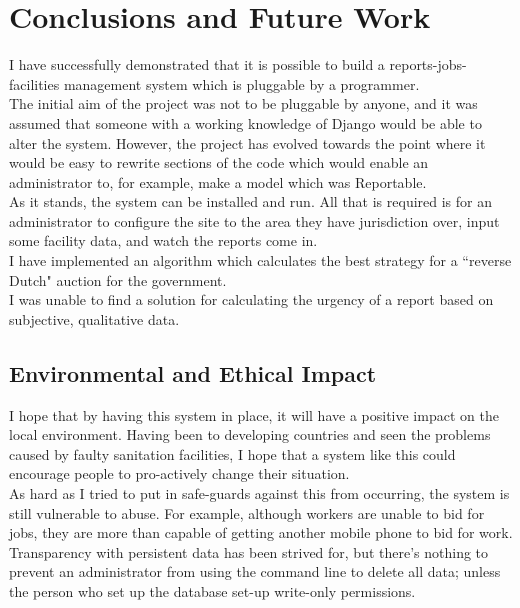 \chapter{Conclusions and Future Work}

I have successfully demonstrated that it is possible to build a reports-jobs-facilities management system which is pluggable by a programmer. \\

The initial aim of the project was not to be pluggable by anyone, and it was assumed that someone with a working knowledge of Django would be able to alter the system. However, the project has evolved towards the point where it would be easy to rewrite sections of the code which would enable an administrator to, for example, make a model which was Reportable. \\

As it stands, the system can be installed and run. All that is required is for an administrator to configure the site to the area they have jurisdiction over, input some facility data, and watch the reports come in. \\

I have implemented an algorithm which calculates the best strategy for a ``reverse Dutch" auction for the government. \\

I was unable to find a solution for calculating the urgency of a report based on subjective, qualitative data.

\section{Environmental and Ethical Impact}
I hope that by having this system in place, it will have a positive impact on the local environment. Having been to developing countries and seen the problems caused by faulty sanitation facilities, I hope that a system like this could encourage people to pro-actively change their situation. \\

As hard as I tried to put in safe-guards against this from occurring, the system is still vulnerable to abuse. For example, although workers are unable to bid for jobs, they are more than capable of getting another mobile phone to bid for work. \\

Transparency with persistent data has been strived for, but there's nothing to prevent an administrator from using the command line to delete all data; unless the person who set up the database set-up write-only permissions. \\

